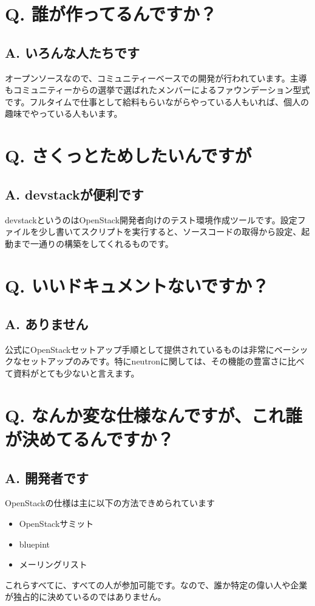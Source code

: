 \documentclass[9pt,b5paper,tombo,openany]{jsbook}
\begin{document}
\section*{Q. 誰が作ってるんですか？}
\subsection*{A. いろんな人たちです}
オープンソースなので、コミュニティーベースでの開発が行われています。主導もコミュニティーからの選挙で選ばれたメンバーによるファウンデーション型式です。フルタイムで仕事として給料もらいながらやっている人もいれば、個人の趣味でやっている人もいます。

\section*{Q. さくっとためしたいんですが}
\subsection*{A. devstackが便利です}
devstackというのはOpenStack開発者向けのテスト環境作成ツールです。設定ファイルを少し書いてスクリプトを実行すると、ソースコードの取得から設定、起動まで一通りの構築をしてくれるものです。

\section*{Q. いいドキュメントないですか？}
\subsection*{A. ありません}
公式にOpenStackセットアップ手順として提供されているものは非常にベーシックなセットアップのみです。特にneutronに関しては、その機能の豊富さに比べて資料がとても少ないと言えます。

\section*{Q. なんか変な仕様なんですが、これ誰が決めてるんですか？}
\subsection*{A. 開発者です}
OpenStackの仕様は主に以下の方法できめられています
\begin{itemize}
	\item OpenStackサミット
	\item bluepint
	\item メーリングリスト
\end{itemize}
これらすべてに、すべての人が参加可能です。なので、誰か特定の偉い人や企業が独占的に決めているのではありません。
\end{document}
